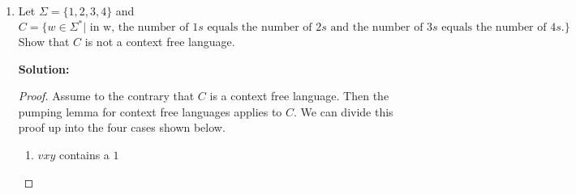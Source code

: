 \documentclass[11pt]{article}
\begin{document}
\begin{enumerate}
\begin{enumerate}
\begin{proof}
\begin{enumerate}
By setting $i = 2$ then $uv^2xy^2z$ will cause $s$ to look like: 
\[
\begin{gathered}
a^{p'}b^p\#a^pb^p \text{ or, } \\
a^pb^{p'}\#a^pb^p \text{ or, } \\
a^pb^p\#a^{p'}b^p \text{ or, } \\
a^pb^p\#a^pb^{p'} \text{     }
\end{gathered}
\]
where $p' \neq p$.  Clearly none of these strings is in the language $D$ so we have a contradiction.  

\item\textbf{Case 2: } If $vxy$ contains the $\#$ character.  
\begin{enumerate}
\item\textbf{Subcase 2a: } If $v$ or $y$ contains the $\#$ then we can set $i=0$ to get $uv^0xy^0z = uxz$ which doesn't contain the $\#$ character so $uv^0xy^0z$ is not an element of the language $D$, which is a contradiction.  

\item\textbf{Subcase 2b: } If $x$ contains the $\#$ character then $v$ is a substring of $b^p = underbrace{b \ldots b}_\text{p}$ and $y$ is a substring of $a^p = underbrace{a \ldots a}_\text{p}$.  Again, by setting $i=0$ then we get $uv^0xy^0z$ which looks something like $a^pb^{p'}\#a^{p'}b^p$ where $p' \neq p$.  Therefore, $t_1 \neq t_2$ so $uv^0xy^0z \not \in D$, which is a contradiction to our original assumption.  
\end{enumerate}
\end{enumerate}
Since we've ended up with contradictions at every possible case of representing $s$, we can conclude that $D$ is not a context free language.  
\end{proof}

\end{enumerate}

\newpage
\item

Let $\Sigma = \{ 1,2,3,4 \}$ and $C = \{ w \in \Sigma^* | \text{ in w, the number of }1s\text{ equals the number of }2s\text{ and the number of }3s\text{ equals the number of }4s. \}$  Show that $C$ is not a context free language.  

\textbf{Solution: }
\begin{proof}
Assume to the contrary that $C$ is a context free language.  Then the pumping lemma for context free languages applies to $C$.  We can divide this proof up into the four cases shown below.  
\begin{enumerate}
\item{} $vxy$ contains a $1$


\end{enumerate}
\end{proof}
\end{enumerate}
\end{document}
